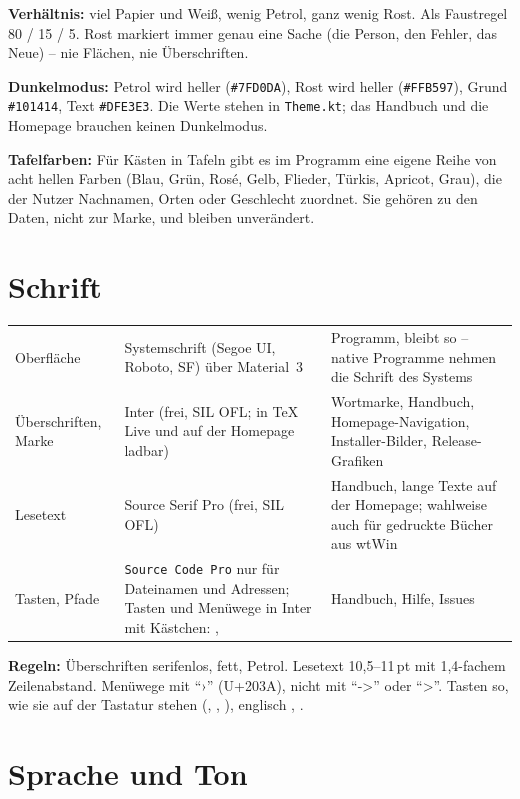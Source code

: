 \documentclass[a4paper, 11pt, parskip=half, headings=small, numbers=noenddot]{scrartcl}
\begin{document}
\textbf{Verhältnis:} viel Papier und Weiß, wenig Petrol, ganz wenig Rost. Als Faustregel 80 / 15 / 5. Rost markiert immer genau eine Sache (die Person, den Fehler, das Neue) – nie Flächen, nie Überschriften.

\textbf{Dunkelmodus:} Petrol wird heller (\texttt{\#7FD0DA}), Rost wird heller (\texttt{\#FFB597}), Grund \texttt{\#101414}, Text \texttt{\#DFE3E3}. Die Werte stehen in \texttt{Theme.kt}; das Handbuch und die Homepage brauchen keinen Dunkelmodus.

\textbf{Tafelfarben:} Für Kästen in Tafeln gibt es im Programm eine eigene Reihe von acht hellen Farben (Blau, Grün, Rosé, Gelb, Flieder, Türkis, Apricot, Grau), die der Nutzer Nachnamen, Orten oder Geschlecht zuordnet. Sie gehören zu den Daten, nicht zur Marke, und bleiben unverändert.

\section{Schrift}

\begin{tabularx}{\linewidth}{lYY}
\toprule
\wtKopf{} &  &  \\
\midrule
Oberfläche & Systemschrift (Segoe UI, Roboto, SF) über Material~3 & Programm, bleibt so – native Programme nehmen die Schrift des Systems \\
Überschriften, Marke & \textsf{Inter} (frei, SIL OFL; in TeX Live und auf der Homepage ladbar) & Wortmarke, Handbuch, Homepage-Navigation, Installer-Bilder, Release-Grafiken \\
Lesetext & \textrm{Source Serif Pro} (frei, SIL OFL) & Handbuch, lange Texte auf der Homepage; wahlweise auch für gedruckte Bücher aus wtWin \\
Tasten, Pfade & \texttt{Source Code Pro} nur für Dateinamen und Adressen; Tasten und Menüwege in Inter mit Kästchen: ,  & Handbuch, Hilfe, Issues \\
\bottomrule
\end{tabularx}

\textbf{Regeln:} Überschriften serifenlos, fett, Petrol. Lesetext 10,5–11\,pt mit 1,4-fachem Zeilenabstand. Menüwege mit \enquote{›} (U+203A), nicht mit \enquote{->} oder \enquote{>}. Tasten so, wie sie auf der Tastatur stehen (, , ), englisch , .

\section{Sprache und Ton}
\end{document}
